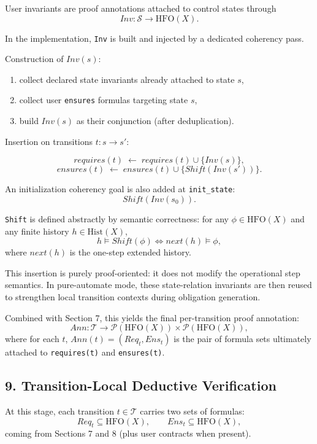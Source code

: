 \documentclass[
]{article}
\providecommand{\tightlist}{%
  \setlength{\itemsep}{0pt}\setlength{\parskip}{0pt}}
\begin{document}
User invariants are proof annotations attached to control states through
\[
Inv:\mathcal S\to \mathrm{HFO}(X).
\]

In the implementation, \texttt{Inv} is built and injected by a dedicated
coherency pass.

Construction of \(Inv(s)\):

\begin{enumerate}
\def\labelenumi{\arabic{enumi}.}
\tightlist
\item
  collect declared state invariants already attached to state \(s\),
\item
  collect user \texttt{ensures} formulas targeting state \(s\),
\item
  build \(Inv(s)\) as their conjunction (after deduplication).
\end{enumerate}

Insertion on transitions \(t:s\to s'\):

\[
requires(t)\;\leftarrow\;requires(t)\cup\{Inv(s)\},
\] \[
ensures(t)\;\leftarrow\;ensures(t)\cup\{Shift(Inv(s'))\}.
\]

An initialization coherency goal is also added at \texttt{init\_state}:
\[
Shift(Inv(s_0)).
\]

\texttt{Shift} is defined abstractly by semantic correctness: for any
\(\phi\in\mathrm{HFO}(X)\) and any finite history
\(h\in\mathrm{Hist}(X)\), \[
h \models Shift(\phi)\iff next(h)\models \phi,
\] where \(next(h)\) is the one-step extended history.

This insertion is purely proof-oriented: it does not modify the
operational step semantics. In pure-automate mode, these state-relation
invariants are then reused to strengthen local transition contexts
during obligation generation.

Combined with Section 7, this yields the final per-transition proof
annotation: \[
Ann:\mathcal T\to \mathcal P(\mathrm{HFO}(X))\times \mathcal P(\mathrm{HFO}(X)),
\] where for each \(t\), \(Ann(t)=(Req_t,Ens_t)\) is the pair of formula
sets ultimately attached to \texttt{requires(t)} and
\texttt{ensures(t)}.

\subsection{9. Transition-Local Deductive
Verification}\label{transition-local-deductive-verification}

At this stage, each transition \(t\in\mathcal T\) carries two sets of
formulas: \[
Req_t\subseteq \mathrm{HFO}(X),\qquad Ens_t\subseteq \mathrm{HFO}(X),
\] coming from Sections 7 and 8 (plus user contracts when present).
\end{document}

